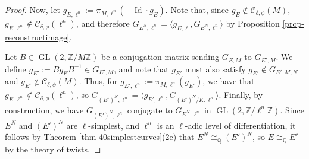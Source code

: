 \documentclass[11pt]{amsart}
\theoremstyle{definition}
\newcommand{\Q}{\mathbb{Q}}
\newcommand{\Z}{\mathbb{Z}}
\newcommand{\Of}{\mathcal{O}_{K,f}}
\newcommand{\Gal}{\operatorname{Gal}}
\newcommand{\GL}{\operatorname{GL}}
\DeclareMathOperator{\im}{im}  %
\DeclareMathOperator{\Id}{Id}  %
\begin{document}
\begin{proof}
    Now, let $g_{E, \ell^n} := \pi_{M, \ell^n}(-\Id \cdot g_E)$. Note that, since $g_E \notin \mathcal{C}_{\delta, \phi}(M)$, $g_{E, \ell^n} \notin \mathcal{C}_{\delta, \phi}(\ell^n)$, and therefore $G_{E^N, \ell^n} = \langle g_{E, \ell}, G_{E^N, \ell^n} \rangle$ by Proposition \ref{prop-reconstructimage}.

    Let $B \in \GL(2, \Z/M\Z)$ be a conjugation matrix sending $G_{E, M}$ to $G_{E', M}$. We define $g_{E'} := B g_E B^{-1} \in G_{E', M}$, and note that $g_{E'}$ must also satisfy $g_{E'} \notin G_{E', M, N}$ and $g_{E'} \notin \mathcal{C}_{\delta, \phi}(M)$. Thus, for $g_{E', \ell^n} := \pi_{M, \ell^n}(g_{E'})$, we have that $g_{E, \ell^n} \notin \mathcal{C}_{\delta, \phi}(\ell^n)$, so $G_{(E')^N, \ell^n} = \langle g_{E', \ell^n}, G_{(E')^N/K, \ell^n} \rangle$. Finally, by construction, we have $G_{(E')^N, \ell^n}$ conjugate to $G_{E^N, \ell^n}$ in $\GL(2, \Z/\ell^n \Z)$. Since $E^N$ and $(E')^N$ are $\ell$-simplest, and $\ell^n$ is an $\ell$-adic level of differentiation, it follows by Theorem \ref{thm-40simplestcurves}(2e) that $E^N \cong_{\Q} (E')^N$, so $E \cong_{\Q} E'$ by the theory of twists.
    \end{proof}
    

    

    



    
 
\end{document}
